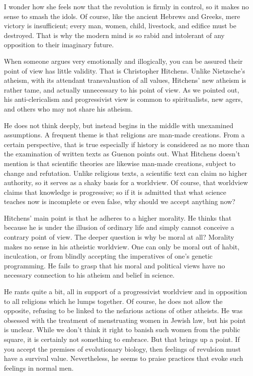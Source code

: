 I wonder how she feels now that the revolution is firmly in control, so it makes no sense to smash the idols. Of course, like the ancient Hebrews and Greeks, mere victory is insufficient; every man, women, child, livestock, and edifice must be destroyed. That is why the modern mind is so rabid and intolerant of any opposition to their imaginary future.

When someone argues very emotionally and illogically, you can be assured their point of view has little validity. That is Christopher Hitchens. Unlike Nietzsche's atheism, with its attendant transvaluation of all values, Hitchens' new atheism is rather tame, and actually unnecessary to his point of view. As we pointed out, his anti-clericalism and progressivist view is common to spiritualists, new agers, and others who may not share his atheism.

He does not think deeply, but instead begins in the middle with unexamined assumptions. A frequent theme is that religions are man-made creations. From a certain perspective, that is true especially if history is considered as no more than the examination of written texts as Guenon points out. What Hitchens doesn't mention is that scientific theories are likewise man-made creations, subject to change and refutation. Unlike religious texts, a scientific text can claim no higher authority, so it serves as a shaky basis for a worldview. Of course, that worldview claims that knowledge is progressive; so if it is admitted that what science teaches now is incomplete or even false, why should we accept anything now?

Hitchens' main point is that he adheres to a higher morality. He thinks that because he is under the illusion of ordinary life and simply cannot conceive a contrary point of view. The deeper question is why be moral at all? Morality makes no sense in his atheistic worldview. One can only be moral out of habit, inculcation, or from blindly accepting the imperatives of one's genetic programming. He fails to grasp that his moral and political views have no necessary connection to his atheism and belief in science.

He rants quite a bit, all in support of a progressivist worldview and in opposition to all religions which he lumps together. Of course, he does not allow the opposite, refusing to be linked to the nefarious actions of other atheists. He was obsessed with the treatment of menstruating women in Jewish law, but his point is unclear. While we don't think it right to banish such women from the public square, it is certainly not something to embrace. But that brings up a point. If you accept the premises of evolutionary biology, then feelings of revulsion must have a survival value. Nevertheless, he seems to praise practices that evoke such feelings in normal men.

